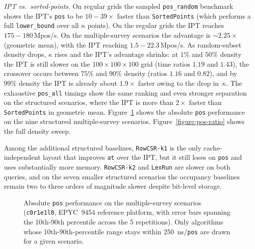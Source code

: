 \documentclass[manuscript,screen,review]{acmart}
\theoremstyle{definition}
\theoremstyle{plain}
\begin{document}
\emph{IPT vs.\ sorted-points.}
On regular grids the sampled \texttt{pos\_random} benchmark shows the IPT's
\texttt{pos} to be $10{-}39\times$ faster than \texttt{SortedPoints}
(which performs a full \texttt{lower\_bound} over all $n$ points).
On the regular grids the IPT reaches $175{-}180$\,Mpos/s.
On the multiple-survey scenarios the advantage is
${\sim}2.25\times$ (geometric mean), with the IPT reaching
$1.5{-}22.3$\,Mpos/s.
As random-subset density drops, $\kappa$ rises and the IPT's
advantage shrinks: at $1\%$ and $50\%$ density the IPT is still
slower on the $100{\times}100{\times}100$ grid (time ratios $1.19$ and
$1.43$), the crossover occurs between $75\%$ and $90\%$ density
(ratios $1.16$ and $0.82$), and by $99\%$ density the IPT is already
about $1.9\times$ faster owing to the drop in~$\kappa$.
The exhaustive \texttt{pos\_all} timings show the same ranking and even
stronger separation on the structured scenarios, where the IPT is
more than $2\times$ faster than \texttt{SortedPoints} in geometric mean.
Figure~\ref{figure:pos-multi-survey} shows the absolute \texttt{pos}
performance on the nine structured multiple-survey scenarios.
Figure~\ref{figure:pos-ratio} shows the full density sweep.

Among the additional structured baselines, \texttt{RowCSR-k1} is the
only cache-independent layout that improves \texttt{at} over the IPT,
but it still loses on \texttt{pos} and uses substantially more memory.
\texttt{RowCSR-k2} and \texttt{LexRun} are slower on both queries, and
on the seven smaller structured scenarios the occupancy baselines
remain two to three orders of magnitude slower despite bit-level
storage.

\begin{figure}
\centering
\resizebox{0.96\linewidth}{!}{}
\caption{Absolute \texttt{pos} performance on the multiple-survey
  scenarios (\texttt{c0r1e1l0}, EPYC~9454 reference platform, with
  error bars spanning the 10th-90th percentile across the 5
  repetitions). Only algorithms whose 10th-90th-percentile range
  stays within 250~ns/\texttt{pos} are drawn for a given scenario.
  }
\label{figure:pos-multi-survey}
\end{figure}
\end{document}
